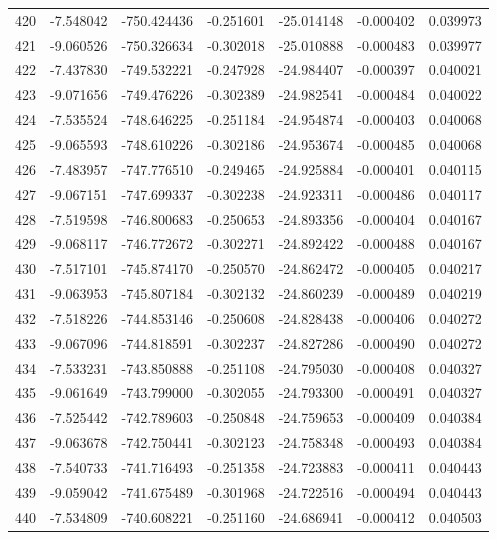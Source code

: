 \begin{tabular}{rrrrrrr}
 420 &  -7.548042 & -750.424436 & -0.251601 & -25.014148 &  -0.000402 &  0.039973 \\
 421 &  -9.060526 & -750.326634 & -0.302018 & -25.010888 &  -0.000483 &  0.039977 \\
 422 &  -7.437830 & -749.532221 & -0.247928 & -24.984407 &  -0.000397 &  0.040021 \\
 423 &  -9.071656 & -749.476226 & -0.302389 & -24.982541 &  -0.000484 &  0.040022 \\
 424 &  -7.535524 & -748.646225 & -0.251184 & -24.954874 &  -0.000403 &  0.040068 \\
 425 &  -9.065593 & -748.610226 & -0.302186 & -24.953674 &  -0.000485 &  0.040068 \\
 426 &  -7.483957 & -747.776510 & -0.249465 & -24.925884 &  -0.000401 &  0.040115 \\
 427 &  -9.067151 & -747.699337 & -0.302238 & -24.923311 &  -0.000486 &  0.040117 \\
 428 &  -7.519598 & -746.800683 & -0.250653 & -24.893356 &  -0.000404 &  0.040167 \\
 429 &  -9.068117 & -746.772672 & -0.302271 & -24.892422 &  -0.000488 &  0.040167 \\
 430 &  -7.517101 & -745.874170 & -0.250570 & -24.862472 &  -0.000405 &  0.040217 \\
 431 &  -9.063953 & -745.807184 & -0.302132 & -24.860239 &  -0.000489 &  0.040219 \\
 432 &  -7.518226 & -744.853146 & -0.250608 & -24.828438 &  -0.000406 &  0.040272 \\
 433 &  -9.067096 & -744.818591 & -0.302237 & -24.827286 &  -0.000490 &  0.040272 \\
 434 &  -7.533231 & -743.850888 & -0.251108 & -24.795030 &  -0.000408 &  0.040327 \\
 435 &  -9.061649 & -743.799000 & -0.302055 & -24.793300 &  -0.000491 &  0.040327 \\
 436 &  -7.525442 & -742.789603 & -0.250848 & -24.759653 &  -0.000409 &  0.040384 \\
 437 &  -9.063678 & -742.750441 & -0.302123 & -24.758348 &  -0.000493 &  0.040384 \\
 438 &  -7.540733 & -741.716493 & -0.251358 & -24.723883 &  -0.000411 &  0.040443 \\
 439 &  -9.059042 & -741.675489 & -0.301968 & -24.722516 &  -0.000494 &  0.040443 \\
 440 &  -7.534809 & -740.608221 & -0.251160 & -24.686941 &  -0.000412 &  0.040503 \\

\end{tabular}
